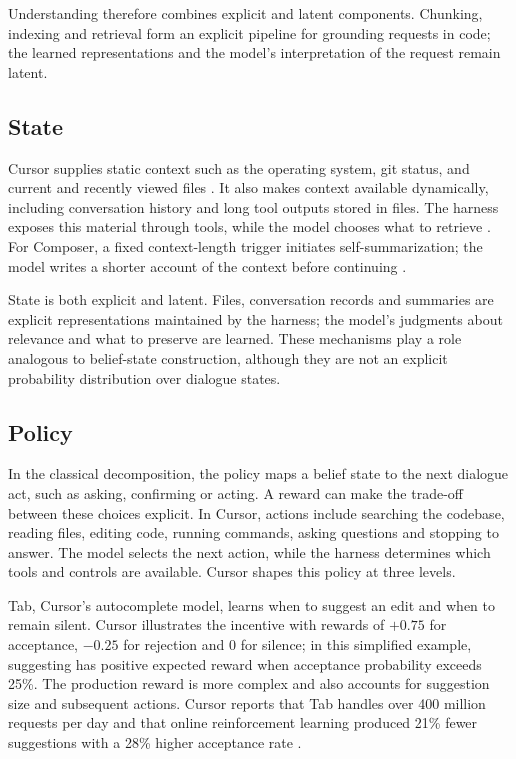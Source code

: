 \documentclass[11pt]{article}
\begin{document}
Understanding therefore combines explicit and latent components. Chunking, indexing and retrieval form an explicit pipeline for grounding requests in code; the learned representations and the model's interpretation of the request remain latent.


\subsection{State}

Cursor supplies static context such as the operating system, git status, and current and recently viewed files \citep{heule2026harness}. It also makes context available dynamically, including conversation history and long tool outputs stored in files. The harness exposes this material through tools, while the model chooses what to retrieve \citep{katz2026dynamic}. For Composer, a fixed context-length trigger initiates self-summarization; the model writes a shorter account of the context before continuing \citep{cassano2026composer}.

State is both explicit and latent. Files, conversation records and summaries are explicit representations maintained by the harness; the model's judgments about relevance and what to preserve are learned. These mechanisms play a role analogous to belief-state construction, although they are not an explicit probability distribution over dialogue states.


\subsection{Policy}

In the classical decomposition, the policy maps a belief state to the next dialogue act, such as asking, confirming or acting. A reward can make the trade-off between these choices explicit. In Cursor, actions include searching the codebase, reading files, editing code, running commands, asking questions and stopping to answer. The model selects the next action, while the harness determines which tools and controls are available. Cursor shapes this policy at three levels.

Tab, Cursor's autocomplete model, learns when to suggest an edit and when to remain silent. Cursor illustrates the incentive with rewards of $+0.75$ for acceptance, $-0.25$ for rejection and $0$ for silence; in this simplified example, suggesting has positive expected reward when acceptance probability exceeds 25\%. The production reward is more complex and also accounts for suggestion size and subsequent actions. Cursor reports that Tab handles over 400 million requests per day and that online reinforcement learning produced 21\% fewer suggestions with a 28\% higher acceptance rate \citep{jackson2025tabrl}.
\end{document}
